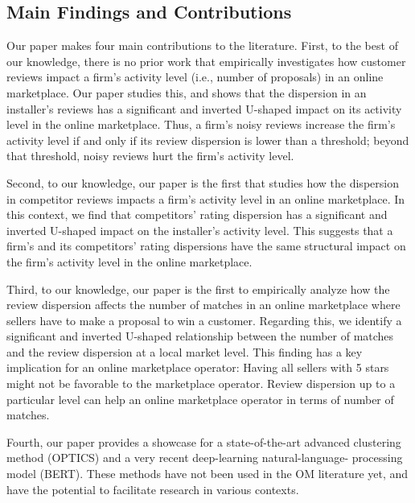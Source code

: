 \documentclass[msom,blindrev]{informs3}
\begin{document}
\subsection{Main Findings and Contributions}

Our paper makes four main contributions to the literature. First, to the best of our knowledge, there is no prior work that empirically investigates how customer reviews impact a firm's activity level (i.e., number of proposals) in an online marketplace. Our paper studies this, and shows that the dispersion in an installer's reviews has a significant and inverted U-shaped impact on its activity level in the online marketplace. Thus, a firm's noisy reviews increase the firm's activity level if and only if its review dispersion is lower than a threshold; beyond that threshold, noisy reviews hurt the firm's activity level.


Second, to our knowledge, our paper is the first that studies how the dispersion in competitor reviews impacts a firm's activity level in an online marketplace. In this context, we find that competitors' rating dispersion has a significant and inverted U-shaped impact on the installer's activity level. This suggests that a firm's and its competitors' rating dispersions have the same structural impact on the firm's activity level in the online marketplace.

Third, to our knowledge, our paper is the first to empirically analyze how the review dispersion affects the number of matches in an online marketplace where sellers have to make a proposal to win a customer. Regarding this, we identify a significant and inverted U-shaped relationship between the number of matches and the review dispersion at a local market level. This finding has a key implication for an online marketplace operator: Having all sellers with 5 stars might not be favorable to the marketplace operator. Review dispersion up to a particular level can help an online marketplace operator in terms of number of matches.

Fourth, our paper provides a showcase for a state-of-the-art advanced clustering method (OPTICS) and a very recent deep-learning natural-language- processing model (BERT). These methods have not been used in the OM literature yet, and have the potential to facilitate research in various contexts.

%
\end{document}
